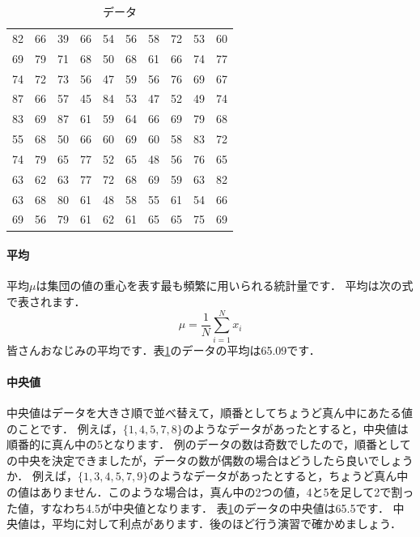 \documentclass[12pt, a4j]{jreport}
\begin{document}
\begin{table}[htb]
    \caption{データ}
    \centering
    \begin{tabular}{cccccccccc}
82 & 66 & 39 & 66 & 54 & 56 & 58 & 72 & 53 & 60 \\
69 & 79 & 71 & 68 & 50 & 68 & 61 & 66 & 74 & 77 \\
74 & 72 & 73 & 56 & 47 & 59 & 56 & 76 & 69 & 67 \\
87 & 66 & 57 & 45 & 84 & 53 & 47 & 52 & 49 & 74 \\
83 & 69 & 87 & 61 & 59 & 64 & 66 & 69 & 79 & 68 \\
55 & 68 & 50 & 66 & 60 & 69 & 60 & 58 & 83 & 72 \\
74 & 79 & 65 & 77 & 52 & 65 & 48 & 56 & 76 & 65 \\
63 & 62 & 63 & 77 & 72 & 68 & 69 & 59 & 63 & 82 \\
63 & 68 & 80 & 61 & 48 & 58 & 55 & 61 & 54 & 66 \\
69 & 56 & 79 & 61 & 62 & 61 & 65 & 65 & 75 & 69 \\
    \end{tabular}
    \label{tab:sample}
\end{table}

\paragraph{平均}
平均$\mu$は集団の値の重心を表す最も頻繁に用いられる統計量です．
平均は次の式で表されます．
\begin{equation}
    \mu = \frac{1}{N} \sum_{i=1}^{N} x_i
\end{equation}
皆さんおなじみの平均です．表\ref{tab:sample}のデータの平均は65.09です．


\paragraph{中央値}
中央値はデータを大きさ順で並べ替えて，順番としてちょうど真ん中にあたる値のことです．
例えば，$\{1, 4, 5, 7, 8\}$のようなデータがあったとすると，中央値は順番的に真ん中の5となります．
例のデータの数は奇数でしたので，順番としての中央を決定できましたが，データの数が偶数の場合はどうしたら良いでしょうか．
例えば，$\{1,3,4,5,7,9\}$のようなデータがあったとすると，ちょうど真ん中の値はありません．このような場合は，真ん中の2つの値，4と5を足して2で割った値，すなわち4.5が中央値となります．
表\ref{tab:sample}のデータの中央値は65.5です．
中央値は，平均に対して利点があります．後のほど行う演習で確かめましょう．
\end{document}

